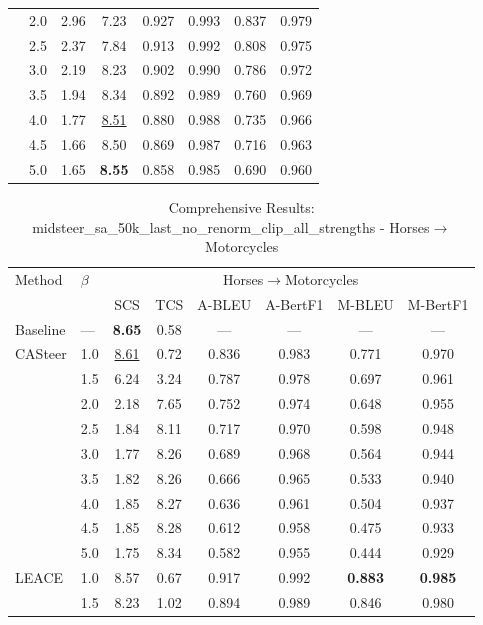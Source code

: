 \begin{table}[htbp]
\begin{tabular}{l|l|cccccc|}
 & 2.0 & 2.96 & 7.23 & 0.927 & 0.993 & 0.837 & 0.979 \\
 & 2.5 & 2.37 & 7.84 & 0.913 & 0.992 & 0.808 & 0.975 \\
 & 3.0 & 2.19 & 8.23 & 0.902 & 0.990 & 0.786 & 0.972 \\
 & 3.5 & 1.94 & 8.34 & 0.892 & 0.989 & 0.760 & 0.969 \\
 & 4.0 & 1.77 & \underline{8.51} & 0.880 & 0.988 & 0.735 & 0.966 \\
 & 4.5 & 1.66 & 8.50 & 0.869 & 0.987 & 0.716 & 0.963 \\
 & 5.0 & 1.65 & \textbf{8.55} & 0.858 & 0.985 & 0.690 & 0.960 \\
\hline
\end{tabular}
\end{table}

\begin{table}[htbp]
\centering
\caption{Comprehensive Results: midsteer\_sa\_50k\_last\_no\_renorm\_clip\_all\_strengths - Horses$\rightarrow$Motorcycles}
\label{tab:midsteersa50klastnorenormclipallstrengths_horsestomotorcycles}
\begin{tabular}{l|l|cccccc|}
\hline
Method & $\beta$ & \multicolumn{6}{c|}{Horses$\rightarrow$Motorcycles} \\
 &  & SCS & TCS & A-BLEU & A-BertF1 & M-BLEU & M-BertF1 \\
\hline
Baseline & — & \textbf{8.65} & 0.58 & — & — & — & — \\
\hline
CASteer & 1.0 & \underline{8.61} & 0.72 & 0.836 & 0.983 & 0.771 & 0.970 \\
 & 1.5 & 6.24 & 3.24 & 0.787 & 0.978 & 0.697 & 0.961 \\
 & 2.0 & 2.18 & 7.65 & 0.752 & 0.974 & 0.648 & 0.955 \\
 & 2.5 & 1.84 & 8.11 & 0.717 & 0.970 & 0.598 & 0.948 \\
 & 3.0 & 1.77 & 8.26 & 0.689 & 0.968 & 0.564 & 0.944 \\
 & 3.5 & 1.82 & 8.26 & 0.666 & 0.965 & 0.533 & 0.940 \\
 & 4.0 & 1.85 & 8.27 & 0.636 & 0.961 & 0.504 & 0.937 \\
 & 4.5 & 1.85 & 8.28 & 0.612 & 0.958 & 0.475 & 0.933 \\
 & 5.0 & 1.75 & 8.34 & 0.582 & 0.955 & 0.444 & 0.929 \\
\hline
LEACE & 1.0 & 8.57 & 0.67 & 0.917 & 0.992 & \textbf{0.883} & \textbf{0.985} \\
 & 1.5 & 8.23 & 1.02 & 0.894 & 0.989 & 0.846 & 0.980 \\

\end{tabular}
\end{table}
